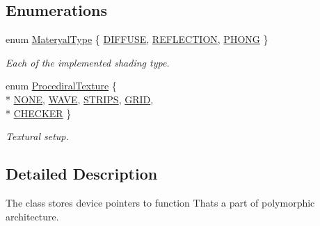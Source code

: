 \subsection*{Enumerations}
\begin{DoxyCompactItemize}
\item 
enum \hyperlink{group__wrapping__and__description_ga4415a3504a4255d8563ded7496546564}{Materyal\+Type} \{ \hyperlink{group__wrapping__and__description_gga4415a3504a4255d8563ded7496546564ae24747f0d4ad269225adda5df5feaa2c}{D\+I\+F\+F\+U\+SE}, 
\hyperlink{group__wrapping__and__description_gga4415a3504a4255d8563ded7496546564abdf82a8e34e808e0be9d4765e88d6692}{R\+E\+F\+L\+E\+C\+T\+I\+ON}, 
\hyperlink{group__wrapping__and__description_gga4415a3504a4255d8563ded7496546564ab105fa30ed5e94117ebf6a37008f5e49}{P\+H\+O\+NG}
 \}\begin{DoxyCompactList}\small\item\em Each of the implemented shading type. \end{DoxyCompactList}
\item 
enum \hyperlink{group__wrapping__and__description_gadbd34cc71bd63d767b48ef9a2fc91c7b}{Procediral\+Texture} \{ \\*
\hyperlink{group__wrapping__and__description_ggadbd34cc71bd63d767b48ef9a2fc91c7bac157bdf0b85a40d2619cbc8bc1ae5fe2}{N\+O\+NE}, 
\hyperlink{group__wrapping__and__description_ggadbd34cc71bd63d767b48ef9a2fc91c7ba4025728e15f4cee76a85d2cc65ccb565}{W\+A\+VE}, 
\hyperlink{group__wrapping__and__description_ggadbd34cc71bd63d767b48ef9a2fc91c7ba7722877891b40e3f2d2b413d06067894}{S\+T\+R\+I\+PS}, 
\hyperlink{group__wrapping__and__description_ggadbd34cc71bd63d767b48ef9a2fc91c7bafbf4fa9eb81ba842a80a29b45064e348}{G\+R\+ID}, 
\\*
\hyperlink{group__wrapping__and__description_ggadbd34cc71bd63d767b48ef9a2fc91c7bade60519f49c1d1276c2df9c2dc500297}{C\+H\+E\+C\+K\+ER}
 \}\begin{DoxyCompactList}\small\item\em Textural setup. \end{DoxyCompactList}
\end{DoxyCompactItemize}


\subsection{Detailed Description}
The class stores device pointers to function That\textquotesingle{}s a part of polymorphic architecture. 



